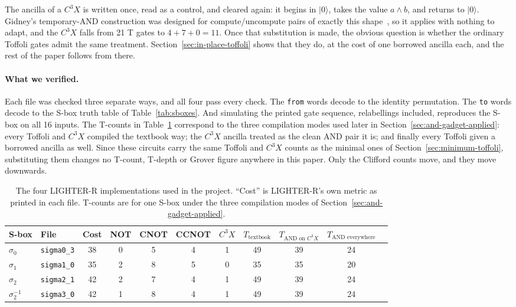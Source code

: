 \documentclass[runningheads,10pt]{llncs}
\begin{document}
 The ancilla of a $C^3X$ is written once, read as a control, and cleared again: it begins in $|0\rangle$, takes the value $a \wedge b$, and returns to $|0\rangle$. Gidney's temporary-AND construction was designed for compute/uncompute pairs of exactly this shape~\cite{gidney2018halving}, so it applies with nothing to adapt, and the $C^3X$ falls from 21 T gates to $4+7+0=11$. Once that substitution is made, the obvious question is whether the ordinary Toffoli gates admit the same treatment. Section~\ref{sec:in-place-toffoli} shows that they do, at the cost of one borrowed ancilla each, and the rest of the paper follows from there.


\paragraph{What we verified.} Each file was checked three separate ways, and all four pass every check. The \texttt{from} words decode to the identity permutation. The \texttt{to} words decode to the S-box truth table of Table~\ref{tab:sboxes}. And simulating the printed gate sequence, relabellings included, reproduces the S-box on all 16 inputs. The T-counts in Table~\ref{tab:lighterr-summary} correspond to the three compilation modes used later in Section~\ref{sec:and-gadget-applied}: every Toffoli and $C^3X$ compiled the textbook way; the $C^3X$ ancilla treated as the clean AND pair it is; and finally every Toffoli given a borrowed ancilla as well. Since these circuits carry the same Toffoli and $C^3X$ counts as the minimal ones of Section~\ref{sec:minimum-toffoli}, substituting them changes no T-count, T-depth or Grover figure anywhere in this paper. Only the Clifford counts move, and they move downwards.

\begin{table}[htbp]
\centering
\caption{The four LIGHTER-R implementations used in the project. ``Cost'' is LIGHTER-R's own metric as printed in each file. T-counts are for one S-box under the three compilation modes of Section~\ref{sec:and-gadget-applied}.}
\label{tab:lighterr-summary}
\small
\begin{tabular}{llccccccccc}
\toprule
S-box & File & Cost & NOT & CNOT & CCNOT & $C^3X$ & $T_{\text{textbook}}$ & $T_{\text{AND on }C^3X}$ & $T_{\text{AND everywhere}}$ \\
\midrule
$\sigma_0$ & \texttt{sigma0\_3} & 38 & 0 & 5 & 4 & 1 & 49 & 39 & 24 \\
$\sigma_1$ & \texttt{sigma1\_0} & 35 & 2 & 8 & 5 & 0 & 35 & 35 & 20 \\
$\sigma_2$ & \texttt{sigma2\_1} & 42 & 2 & 7 & 4 & 1 & 49 & 39 & 24 \\
$\sigma_2^{-1}$ & \texttt{sigma3\_0} & 42 & 1 & 8 & 4 & 1 & 49 & 39 & 24 \\
\bottomrule
\end{tabular}
\end{table}
\end{document}
